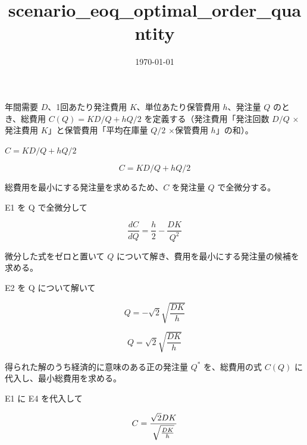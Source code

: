 \documentclass[dvipdfmx,a4paper,11pt]{jsarticle}
\title{scenario\_eoq\_optimal\_order\_quantity}
\date{\today}
\begin{document}
\maketitle

年間需要 $D$、1回あたり発注費用 $K$、単位あたり保管費用 $h$、発注量 $Q$ のとき、総費用 $C(Q)=KD/Q+hQ/2$ を定義する（発注費用「発注回数 $D/Q$ $\times$発注費用 $K$」と保管費用「平均在庫量 $Q/2$ $\times$保管費用 $h$」の和）。

$C = K D / Q + h Q / 2$

\begin{equation}
  C = K D / Q + h Q / 2
  \label{eq:E1}
\end{equation}

総費用を最小にする発注量を求めるため、$C$ を発注量 $Q$ で全微分する。

E1 を Q で全微分して

\begin{equation}
  \frac{dC}{dQ} = \frac{h}{2}-\frac{D K}{Q^2}
  \label{eq:E2}
\end{equation}

微分した式をゼロと置いて $Q$ について解き、費用を最小にする発注量の候補を求める。

E2 を Q について解いて

\begin{equation}
  Q = -\sqrt{2} \sqrt{\frac{D K}{h}}
  \label{eq:E3}
\end{equation}

\begin{equation}
  Q = \sqrt{2} \sqrt{\frac{D K}{h}}
  \label{eq:E4}
\end{equation}

得られた解のうち経済的に意味のある正の発注量 $Q^*$ を、総費用の式 $C(Q)$ に代入し、最小総費用を求める。

E1 に E4 を代入して

\begin{equation}
  C = {{\sqrt{2} D K}\over{\sqrt{\frac{D K}{h}}}}
  \label{eq:E5}
\end{equation}
\end{document}

